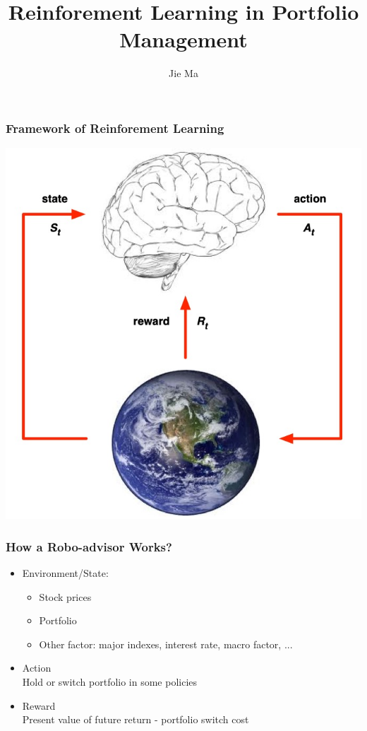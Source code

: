 \documentclass[11pt]{beamer}
\author{Jie Ma}
\title{Reinforement Learning in Portfolio Management}
\begin{document}
\frame{\titlepage}

\begin{frame}[c]\frametitle{Framework of Reinforement Learning}
    \begin{center}
    \includegraphics[scale=0.3]{rl_intro.jpg}
    \end{center}
\end{frame}

\begin{frame}[c]\frametitle{How a Robo-advisor Works?}
    \begin{itemize}
    \item Environment/State:
    \begin{itemize}
        \item Stock prices
        \item Portfolio
        \item Other factor: major indexes, interest rate, macro factor, ...
    \end{itemize}
    \item Action\\Hold or switch portfolio in some policies 
    \item Reward\\Present value of future return - portfolio switch cost
    \end{itemize}
\end{frame}
\end{document}
